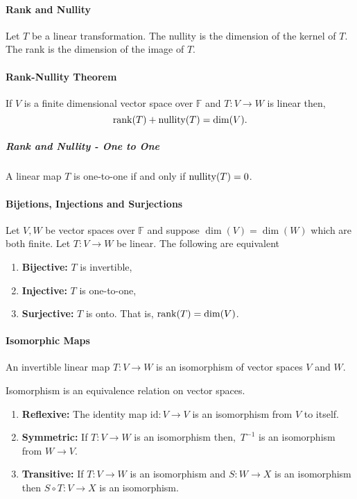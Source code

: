 \paragraph{Rank and Nullity}
Let \(T\) be a linear transformation. The nullity is the dimension
of the kernel of \(T\).
The rank is the dimension of the image of \(T\).

\paragraph{Rank-Nullity Theorem}
If \(V\) is a finite dimensional vector space over \(\mathbb{F}\) and
\(T: V \to W\) is linear then,
\[\rank(T) + \mathrm{nullity}(T) = \dim(V).\]

\subparagraph{Rank and Nullity - One to One}
A linear map \(T\) is one-to-one if and only if
\(\mathrm{nullity}(T) = 0\).

\paragraph{Bijetions, Injections and Surjections}
Let \(V, W\) be vector spaces over \(\mathbb{F}\) and suppose
\(\dim(V) = \dim(W)\) which are both finite.
Let \(T: V \to W\) be linear.
The following are equivalent
\begin{enumerate}
    \item \textbf{Bijective:} \(T\) is invertible,
    \item \textbf{Injective:} \(T\) is one-to-one,
    \item \textbf{Surjective:} \(T\) is onto. That is, \(\rank(T) = \dim(V)\).
\end{enumerate}

\paragraph{Isomorphic Maps}
An invertible linear map \(T: V \to W\) is an isomorphism of
vector spaces \(V\) and \(W\).

Isomorphism is an equivalence relation on vector spaces.
\begin{enumerate}
    \item \textbf{Reflexive:} The identity map \(\mathrm{id}: V\to V\) is
        an isomorphism from \(V\) to itself.
    \item \textbf{Symmetric:} If \(T: V \to W\) is an isomorphism then,\
        \(T^{-1}\) is an isomorphism from \(W \to V\).
    \item \textbf{Transitive:} If \(T: V \to W\) is an isomorphism and
        \(S: W\to X\) is an isomorphism then
        \(S \circ T : V \to X\) is an isomorphism.
\end{enumerate}

